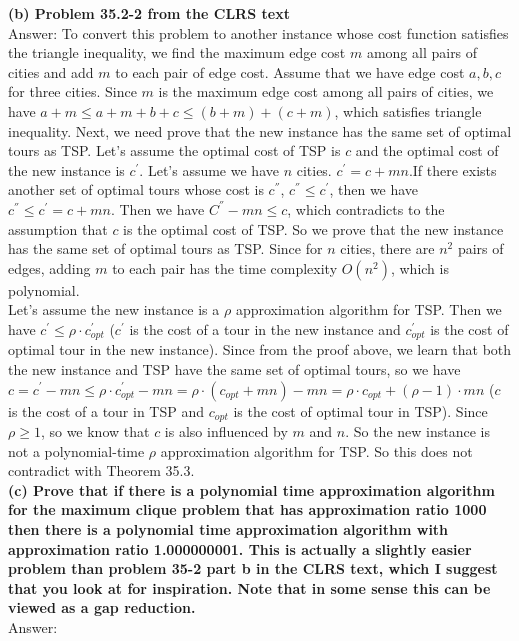\documentclass{article}
\begin{document}
\textbf{(b) Problem 35.2-2 from the CLRS text} \\ \newline
Answer: To convert this problem to another instance whose cost function satisfies the triangle inequality, we find the maximum edge cost $m$ among all pairs of cities and add $m$ to each pair of edge cost. Assume that we have edge cost $a, b, c$ for three cities. Since $m$ is the maximum edge cost among all pairs of cities, we have $a + m \leq a + m + b + c \leq (b + m) + (c + m)$, which satisfies triangle inequality. Next, we need prove that the new instance has the same set of optimal tours as TSP. Let's assume the optimal cost of TSP is $c$ and the optimal cost of the new instance is $c^{'}$. Let's assume we have $n$ cities. $c^{'} = c + mn$.If there exists another set of optimal tours whose cost is $c^{''}$, $c^{''}\leq c^{'}$, then we have $c^{''}\leq c^{'} = c + mn$. Then we have $C^{''} - mn \leq c$, which contradicts to the assumption that $c$ is the optimal cost of TSP. So we prove that the new instance has the same set of optimal tours as TSP. Since for $n$ cities, there are $n^2$ pairs of edges, adding $m$ to each pair has the time complexity $O(n^2)$, which is polynomial.\\ \newline
Let's assume the new instance is a $\rho$ approximation algorithm for TSP. Then we have $c^{'} \leq \rho \cdot c_{opt}^{'}$ ($c^{'}$ is the cost of a tour in the new instance and $c_{opt}^{'}$ is the cost of optimal tour in the new instance). Since from the proof above, we learn that both the new instance and TSP have the same set of optimal tours, so we have $c = c^{'} - mn \leq \rho \cdot c_{opt}^{'} - mn = \rho \cdot (c_{opt} + mn) - mn = \rho \cdot c_{opt} + (\rho - 1)\cdot mn$ ($c$ is the cost of a tour in TSP and $c_{opt}$ is the cost of optimal tour in TSP). Since $\rho \geq 1$, so we know that $c$ is also influenced by $m$ and $n$. So the new instance is not a polynomial-time $\rho$ approximation algorithm for TSP. So this does not contradict with Theorem 35.3.\\ \newline
\textbf{(c) Prove that if there is a polynomial time approximation algorithm for the maximum clique problem that has approximation ratio 1000 then there is a polynomial time approximation algorithm with approximation ratio 1.000000001. This is actually a slightly easier problem than problem 35-2 part b in the CLRS text, which I suggest that you look at for inspiration. Note that in some sense this can be viewed as a gap reduction.}\\ \newline
Answer: 
\end{document}
